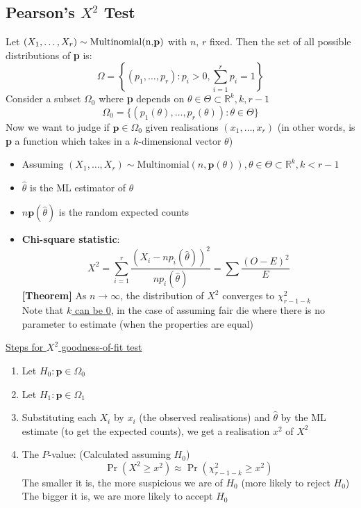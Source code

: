 \documentclass{article}
\begin{document}
\begin{multicols}{2}
\subsection{Pearson's $X^2$ Test}
Let $(X_1, \dots, X_r) \sim \text{Multinomial(n,\textbf{p})}$ with $n$, $r$ fixed. Then the set of all possible distributions of \textbf{p} is:
$$\Omega = \left\{(p_1,\dots,p_r):p_i>0, \sum_{i=1}^rp_i=1\right\}$$
Consider a subset $\Omega_0$ where \textbf{p} depends on $\theta \in \Theta \subset\mathbb{R}^k, k,r-1$
$$\Omega_0 = \{(p_1(\theta), \dots, p_r(\theta)):\theta\in\Theta\}$$
Now we want to judge if $\textbf{p}\in\Omega_0$ given realisations $(x_1,\dots,x_r)$ (in other words, is \textbf{p} a function which takes in a $k$-dimensional vector $\theta$)
\begin{itemize}
	\item Assuming $(X_1, \dots, X_r) \sim \text{Multinomial}(n,\textbf{p}(\theta)), \theta\in\Theta\subset\mathbb{R}^{k},k<r-1$
	\item $\hat{\theta}$ is the ML estimator of $\theta$
	\item $n\textbf{p}(\hat{\theta})$ is the random expected counts
	\item \textbf{Chi-square statistic}:
	$$X^2 = \sum_{i=1}^r\frac{(X_i-np_i(\hat{\theta}))^2}{np_i(\hat{\theta})} = \sum\frac{(O-E)^2}{E}$$
	\textbf{[Theorem]} As $n\rightarrow\infty$, the distribution of $X^2$ converges to $\chi^2_{r-1-k}$\\
	Note that \underline{$k$ can be 0}, in the case of assuming fair die where there is no parameter to estimate (when the properties are equal)
\end{itemize}
\underline{Steps for $X^2$ goodness-of-fit test}
\begin{enumerate}
	\item Let $H_0 :\textbf{p} \in \Omega_0$
	\item Let $H_1 :\textbf{p} \in \Omega_1$
	\item Substituting each $X_i$ by $x_i$ (the observed realisations) and $\hat{\theta}$ by the ML estimate (to get the expected counts), we get a realisation $x^2$ of $X^2$
	\item The $P$-value: (Calculated assuming $H_0$)
	$$\Pr(X^2\geq x^2) \approx \Pr(\chi^2_{r-1-k}\geq x^2)$$
	The smaller it is, the more suspicious we are of $H_0$ (more likely to reject $H_0$)\\
	The bigger it is, we are more likely to accept $H_0$\\
\end{enumerate}

\end{multicols}
\end{document}
